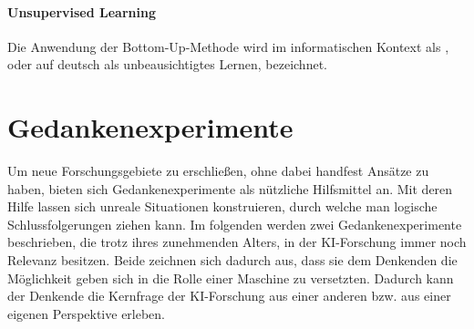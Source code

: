 \documentclass[12pt,german,ngerman]{report}
\begin{document}
        \subsubsection{Unsupervised Learning}
            Die Anwendung der Bottom-Up-Methode wird im informatischen Kontext als , oder auf deutsch als unbeausichtigtes Lernen, bezeichnet.
             
            

\chapter{Gedankenexperimente}
    Um neue Forschungsgebiete zu erschließen, ohne dabei handfest Ansätze zu haben,
    bieten sich Gedankenexperimente als nützliche Hilfsmittel an.
    Mit deren Hilfe lassen sich unreale Situationen konstruieren, durch welche man logische Schlussfolgerungen ziehen kann.
    Im folgenden werden zwei Gedankenexperimente beschrieben, die trotz ihres zunehmenden Alters, in der KI-Forschung
    immer noch Relevanz besitzen. Beide zeichnen sich dadurch aus, dass sie dem Denkenden die Möglichkeit geben sich in die
    Rolle einer Maschine zu versetzten. Dadurch kann der Denkende die Kernfrage der KI-Forschung aus einer anderen
    bzw. aus einer eigenen Perspektive erleben. 
\end{document}
